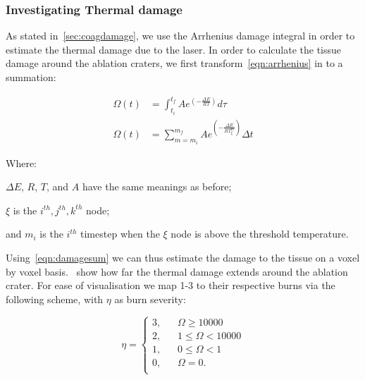\subsubsection{Investigating Thermal damage} 

As stated in~\cref{sec:coagdamage}, we use the Arrhenius damage integral in order to estimate the thermal damage due to the laser. In order to calculate the tissue damage around the ablation craters, we first transform~\cref{eqn:arrhenius} in to a summation:

\begin{align}
\Omega(t) &= \int^{t_{f}}_{t_i} Ae^{(-\tfrac{\Delta E}{RT})}d\tau \\
\Omega(t) &= \sum_{m=m_i}^{m_f} Ae^{(-\tfrac{\Delta E}{RT_{\xi}^{m}})}\Delta t\label{eqn:damagesum}
\end{align}
 
\noindent Where: 
	
	\indent $\Delta E$, $R$, $T$, and $A$ have the same meanings as before;
	
	\indent $\xi$ is the $i^{th}, j^{th}, k^{th}$ node;
	
	\indent and $m_i$ is the $i^{th}$ timestep when the $\xi$ node is above the threshold temperature.

	\medskip
	
	Using~\cref{eqn:damagesum} we can thus estimate the damage to the tissue on a voxel by voxel basis.~ show how far the thermal damage extends around the ablation crater. For ease of visualisation we map 1-3 to their respective burns via the following scheme, with $\eta$ as burn severity:
	
\begin{equation}
\eta = 
     \begin{cases}
       \text{3,} &\quad \Omega \geq 10000\\
       \text{2,} &\quad 1 \leq \Omega < 10000\\
       \text{1,} &\quad 0 \leq \Omega < 1\\
       \text{0,} &\quad \Omega=0.\\
     \end{cases}
\end{equation}

